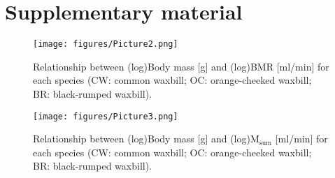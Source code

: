 \documentclass[10pt, twoside]{book} %
\begin{document}
\clearpage
\renewcommand\thesection{\arabic{chapter}.\arabic{section}}
\section{Supplementary material}
\renewcommand\thesection{\arabic{chapter}.\arabic{section}}
\renewcommand{\thefigure}{\arabic{chapter}.\arabic{figure}}

\renewcommand\thesection{\arabic{chapter}.\arabic{section}}
\renewcommand{\thefigure}{1.\arabic{figure}}
	\begin{figure}[h!]
		\begin{center}
\small
			\texttt{[image: figures/Picture2.png]}
		\end{center}
		\begin{footnotesize}
			\caption{\footnotesize Relationship between (log)Body mass [g] and (log)BMR [ml/min] for each species (CW: common waxbill; OC: orange-cheeked waxbill; BR: black-rumped waxbill).\label{fig1.2}}
		\end{footnotesize}
	\end{figure}
\clearpage

\renewcommand{\thefigure}{1.\arabic{figure}}
	\begin{figure}[h!]
		\begin{center}
\small
			\texttt{[image: figures/Picture3.png]}
		\end{center}
		\begin{footnotesize}
			\caption{\footnotesize Relationship between (log)Body mass [g] and (log)M$_{\text{sum}}$ [ml/min] for each species (CW: common waxbill; OC: orange-cheeked waxbill; BR: black-rumped waxbill).\label{fig1.2}}
		\end{footnotesize}
	\end{figure}
\clearpage
\end{document}

